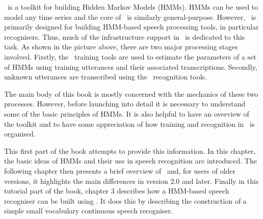 %
%


\HTK\ is a toolkit for building Hidden Markov Models (HMMs). 
HMMs can be used to model any time series and the core of 
\HTK\ is similarly general-purpose. However, \HTK\ is primarily
designed for building HMM-based speech processing tools,  in
particular recognisers.  Thus, much of the infrastructure
support in \HTK\ is dedicated to this task.  As shown in the picture
above, there are two major processing stages involved.  Firstly,
the \HTK\ training tools are used to estimate the parameters of a set
of HMMs using 
training utterances and their associated transcriptions. Secondly,
unknown utterances are transcribed using the \HTK\ recognition tools.


The main body of this book is mostly concerned with the mechanics of these
two processes. However, before launching into detail it is necessary to
understand some of the basic principles of HMMs.  It is also helpful to have
an overview of the toolkit and to have some appreciation of 
how training and recognition in \HTK\ is organised. 

This first part of the book attempts to provide this information. In this
chapter, the basic ideas of HMMs and their use in speech recognition are
introduced.  The following chapter then presents a brief overview
of \HTK\ and, for users of older versions, it highlights the main
differences in version 2.0 and later.  Finally in this tutorial part of the book, chapter 3
describes how a HMM-based speech
recogniser can be built using
\HTK.  It does this by describing the construction of a simple small vocabulary
continuous speech recogniser.

